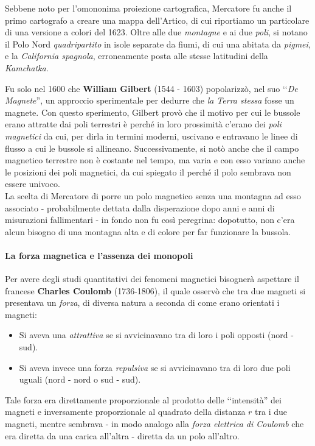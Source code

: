 \begin{digressionwt}
\begin{center}
	\end{center}
\begin{center}
	{\scriptsize Sebbene noto per l'omononima proiezione cartografica, Mercatore fu anche il primo cartografo a creare una mappa dell'Artico, di cui riportiamo un particolare di una versione a colori del 1623. Oltre alle due \textit{montagne} e ai due \textit{poli}, si notano il Polo Nord \textit{quadripartito} in isole separate da fiumi, di cui una abitata da \textit{pigmei}, e la \textit{California spagnola}, erroneamente posta alle stesse latitudini della \textit{Kamchatka}.}%
\end{center}
	Fu solo nel 1600 che \textbf{William Gilbert} (1544 - 1603) popolarizzò, nel suo ‘‘\textit{De Magnete}'', un approccio sperimentale per dedurre che \textit{la Terra stessa} fosse un magnete. Con questo sperimento, Gilbert provò che il motivo per cui le bussole erano attratte dai poli terrestri è perché in loro prossimità c'erano dei \textit{poli magnetici} da cui, per dirla in termini moderni, uscivano e entravano le linee di flusso a cui le bussole si allineano. Successivamente, si notò anche che il campo magnetico terrestre non è costante nel tempo, ma varia e con esso variano anche le posizioni dei poli magnetici, da cui spiegato il perché il polo sembrava non essere univoco.\\
	La scelta di Mercatore di porre un polo magnetico senza una montagna ad esso associato - probabilmente dettata dalla disperazione dopo anni e anni di misurazioni fallimentari - in fondo non fu così peregrina: dopotutto, non c'era alcun bisogno di una montagna alta e di colore per far funzionare la bussola.
\end{digressionwt}
\paragraph{La forza magnetica e l'assenza dei monopoli}
Per avere degli studi quantitativi dei fenomeni magnetici bisognerà aspettare il francese \textbf{Charles Coulomb} (1736-1806), il quale osservò che tra due magneti si presentava un \textit{forza}, di diversa natura a seconda di come erano orientati i magneti:
\begin{itemize}
	\item Si aveva una \textit{attrattiva} se si avvicinavano tra di loro i poli opposti (nord - sud).
	\item Si aveva invece una forza \textit{repulsiva} se si avvicinavano tra di loro due poli uguali (nord - nord o sud - sud).
\end{itemize}
Tale forza era direttamente proporzionale al prodotto delle ‘‘intensità'' dei magneti e inversamente proporzionale al quadrato della distanza $r$ tra i due magneti, mentre sembrava - in modo analogo alla \textit{forza elettrica di Coulomb} che era diretta da una carica all'altra - diretta da un polo all'altro.

